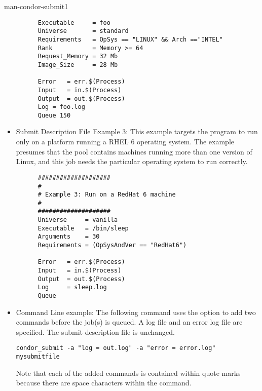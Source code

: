 \begin{ManPage}{}{man-condor-submit}{1}
\begin{itemize}
\begin{verbatim}
      Executable     = foo                                                    
      Universe       = standard
      Requirements   = OpSys == "LINUX" && Arch =="INTEL"
      Rank           = Memory >= 64
      Request_Memory = 32 Mb
      Image_Size     = 28 Mb
                                                                          
      Error   = err.$(Process)                                                
      Input   = in.$(Process)                                                 
      Output  = out.$(Process)                                                
      Log = foo.log                                                                       
      Queue 150
\end{verbatim}
\normalsize

\item{Submit Description File Example 3:}  This example targets the 
 program to run only on a platform running a 
RHEL 6 operating system.
The example presumes that the pool contains machines running more than one
version of Linux, 
and this job needs the particular operating system to run correctly.

\footnotesize
\begin{verbatim}
      ####################                                                    
      #                                                                       
      # Example 3: Run on a RedHat 6 machine
      #                                                                       
      ####################                                                    
      Universe     = vanilla
      Executable   = /bin/sleep
      Arguments    = 30
      Requirements = (OpSysAndVer == "RedHat6")
                                                                          
      Error   = err.$(Process)                                                
      Input   = in.$(Process)                                                 
      Output  = out.$(Process)                                                
      Log     = sleep.log                                                                       
      Queue
\end{verbatim}
\normalsize



\item{Command Line example:} The following command uses the
 option to add two commands before the job(s) is queued.
A log file and an error log file are specified.
The submit description file is unchanged.
\footnotesize
\begin{verbatim}
condor_submit -a "log = out.log" -a "error = error.log" mysubmitfile
\end{verbatim}
\normalsize
Note that each of the added commands is contained within quote marks
because there are space characters within the command.


\end{itemize}
\end{ManPage}
